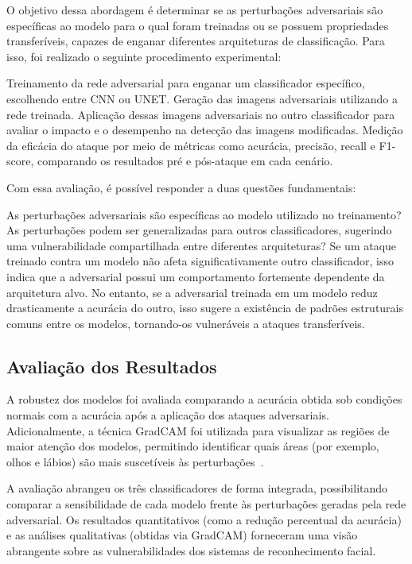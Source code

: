 \documentclass[12pt]{article}
\begin{document}
O objetivo dessa abordagem é determinar se as perturbações adversariais são específicas ao modelo para o qual foram treinadas ou se possuem propriedades transferíveis, capazes de enganar diferentes arquiteturas de classificação. Para isso, foi realizado o seguinte procedimento experimental:

Treinamento da rede adversarial para enganar um classificador específico, escolhendo entre CNN ou UNET.
Geração das imagens adversariais utilizando a rede treinada.
Aplicação dessas imagens adversariais no outro classificador para avaliar o impacto e o desempenho na detecção das imagens modificadas.
Medição da eficácia do ataque por meio de métricas como acurácia, precisão, recall e F1-score, comparando os resultados pré e pós-ataque em cada cenário.

Com essa avaliação, é possível responder a duas questões fundamentais:

As perturbações adversariais são específicas ao modelo utilizado no treinamento?
As perturbações podem ser generalizadas para outros classificadores, sugerindo uma vulnerabilidade compartilhada entre diferentes arquiteturas?
Se um ataque treinado contra um modelo não afeta significativamente outro classificador, isso indica que a adversarial possui um comportamento fortemente dependente da arquitetura alvo. No entanto, se a adversarial treinada em um modelo reduz drasticamente a acurácia do outro, isso sugere a existência de padrões estruturais comuns entre os modelos, tornando-os vulneráveis a ataques transferíveis.

\subsection{Avaliação dos Resultados}

A robustez dos modelos foi avaliada comparando a acurácia obtida sob condições
normais com a acurácia após a aplicação dos ataques adversariais.
Adicionalmente, a técnica GradCAM foi utilizada para visualizar as regiões de
maior atenção dos modelos, permitindo identificar quais áreas (por exemplo,
olhos e lábios) são mais suscetíveis às
perturbações~\cite{selvaraju2017gradcam}.

A avaliação abrangeu os três classificadores de forma integrada, possibilitando
comparar a sensibilidade de cada modelo frente às perturbações geradas pela
rede adversarial. Os resultados quantitativos (como a redução percentual da
acurácia) e as análises qualitativas (obtidas via GradCAM) forneceram uma visão
abrangente sobre as vulnerabilidades dos sistemas de reconhecimento facial.
\end{document}
